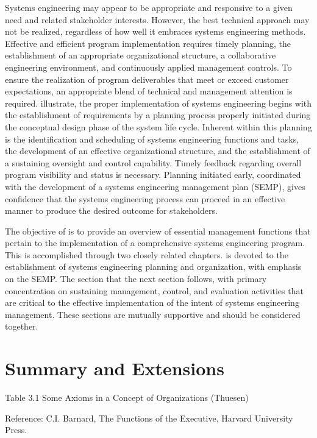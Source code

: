 Systems engineering may appear to be appropriate and responsive to a given need and related stakeholder interests. However, the best technical approach may not be realized, regardless of how well it embraces systems engineering methods. Effective and efficient program implementation requires timely planning, the establishment of an appropriate organizational structure, a collaborative engineering environment, and continuously applied management controls. To ensure the realization of program deliverables that meet or exceed customer expectations, an appropriate blend of technical and management attention is required. illustrate, the proper implementation of systems engineering begins with the establishment of requirements by a planning process properly initiated during the conceptual design phase of the system life cycle. Inherent within this planning is the identification and scheduling of systems engineering functions and tasks, the development of an effective organizational structure, and the establishment of a sustaining oversight and control capability. Timely feedback regarding overall program visibility and status is necessary. Planning initiated early, coordinated with the development of a systems engineering management plan (SEMP), gives confidence that the systems engineering process can proceed in an effective manner to produce the desired outcome for stakeholders.

The objective of is to provide an overview of essential management functions that pertain to the implementation of a comprehensive systems engineering program. This is accomplished through two closely related chapters. is devoted to the establishment of systems engineering planning and organization, with emphasis on the SEMP. The section that the next section follows, with primary concentration on sustaining management, control, and evaluation activities that are critical to the effective implementation of the intent of systems engineering management. These sections are mutually supportive and should be considered together.


\section{Summary and Extensions}

Table 3.1 Some Axioms in a Concept of Organizations (Thuesen)

Reference: C.I. Barnard, The Functions of the Executive, Harvard University Press.

